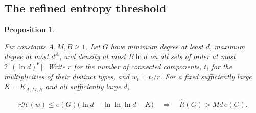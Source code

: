 \documentclass[11pt]{amsart}
\newtheorem{proposition}[theorem]{Proposition}
\theoremstyle{definition}
\theoremstyle{remark}
\numberwithin{equation}{section}
\begin{document}
\subsection{The refined entropy threshold}

\begin{proposition}\label{prop:triple-log}

Fix constants $A,M,B\ge1$. Let $ G $ have minimum degree at least $ d $, maximum degree at most $ d^A $, and density at most $ B\ln d $ on all sets of order at most $2\lceil(\ln d)^6\rceil $. Write $ r $ for the number of connected components, $ t_i $ for the multiplicities of their distinct types, and $ w_i=t_i/r $. For a fixed sufficiently large $ K=K_{A,M,B}$ and all sufficiently large $ d$,

\begin{equation}
r\mathcal H(w)\le e(G)\bigl(\ln d-\ln\ln\ln d-K\bigr)
\quad\Longrightarrow\quad
\widehat R(G)>Md\,e(G).
\end{equation}

\end{proposition}
\end{document}
